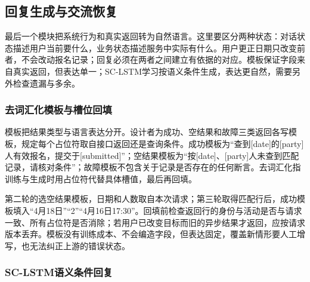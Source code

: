 \subsection{回复生成与交流恢复}
\label{sec:nlp-dialogue-response}

最后一个模块把系统行为和真实返回转为自然语言。这里要区分两种状态：对话状态描述用户当前要什么，业务状态描述服务中实际有什么。用户更正日期只改变前者，不会改动报名记录；回复必须在两者之间建立有依据的对应。模板保证字段来自真实返回，但表达单一；SC-LSTM学习按语义条件生成，表达更自然，需要另外检查遗漏与多余。

\subsubsection{去词汇化模板与槽位回填}
\label{sec:nlp-dialogue-template}

模板把结果类型与语言表达分开。设计者为成功、空结果和故障三类返回各写模板，规定每个占位符取自接口返回还是查询条件。成功模板为“查到[date]的[party]人有效报名，提交于[submitted]”；空结果模板为“按[date]、[party]人未查到匹配记录，请核对条件”；故障模板不包含关于记录是否存在的任何断言。去词汇化指训练与生成时用占位符代替具体槽值，最后再回填。

第二轮的选空结果模板，日期和人数取自本次请求；第三轮取得匹配行后，成功模板填入“4月18日”“2”“4月16日17:30”。回填前检查返回行的身份与活动是否与请求一致、所有占位符是否消除；若用户已改变目标而旧的异步结果才返回，应按请求版本丢弃。模板没有训练成本、不会编造字段，但表达固定，覆盖新情形要人工增写，也无法纠正上游的错误状态。

\subsubsection{SC-LSTM语义条件回复}
\label{sec:nlp-dialogue-sclstm}


